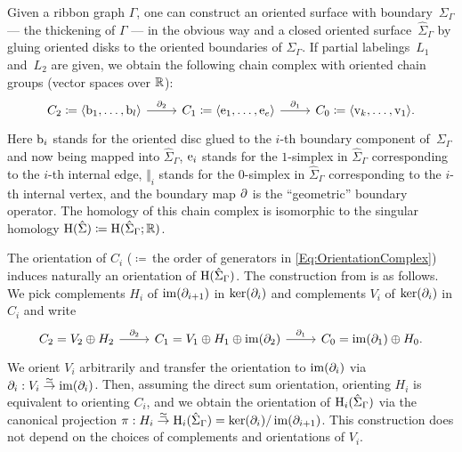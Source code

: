 \documentclass[\MainFolder/Text.tex]{subfiles}
\begin{document}
Given a ribbon graph $\Gamma$, one can construct an oriented surface with boundary~$\Sigma_\Gamma$ --- the thickening of $\Gamma$ --- in the obvious way and a closed oriented surface~$\hat{\Sigma}_\Gamma$ by gluing oriented disks to the oriented boundaries of $\Sigma_\Gamma$. If partial labelings~$L_1$ and~$L_2$ are given, we obtain the following chain complex with oriented chain groups (vector spaces over $\mathbb{R}$):
\begin{equation} \label{Eq:OrientationComplex}
\begin{tikzcd}
C_2\coloneqq \langle \Boundary_1,\dotsc,\Boundary_l \rangle \arrow{r}{\Bdd_2} & C_1\coloneqq \langle \Edge_1,\dotsc, \Edge_e \rangle \arrow{r}{\Bdd_1} &  C_0\coloneqq \langle \Vert_k,\dotsc, \Vert_1 \rangle.
\end{tikzcd}
\end{equation}
Here $\mathrm{b}_i$ stands for the oriented disc glued to the $i$-th boundary component of~$\Sigma_\Gamma$ and now being mapped into $\hat{\Sigma}_\Gamma$, $\mathrm{e}_i$ stands for the $1$-simplex in $\hat{\Sigma}_\Gamma$ corresponding to the $i$-th internal edge, $\Vert_i$ stands for the $0$-simplex in $\hat{\Sigma}_\Gamma$ corresponding to the $i$-th internal vertex, and the boundary map $\partial$ is the ``geometric'' boundary operator. The homology of this chain complex is isomorphic to the singular homology $\mathrm{H}(\hat{\Sigma})\coloneqq\mathrm{H}(\hat{\Sigma}_\Gamma;\mathbb{R})$.

The orientation of $C_i$ ($\coloneqq$\,the order of generators in \eqref{Eq:OrientationComplex}) induces naturally an orientation of $\mathrm{H}(\hat{\Sigma}_\Gamma)$. The construction from \cite[Appendix A]{Cieliebak2015} is as follows. We pick complements $H_i$ of $\operatorname{im}(\partial_{i+1})$ in $\operatorname{ker}(\partial_{i})$ and complements $V_i$ of $\operatorname{ker}(\partial_i)$ in $C_i$ and write 
$$\begin{tikzcd}
C_2 = V_2 \oplus H_2 \arrow{r}{\Bdd_2} & C_1 = V_1 \oplus H_1 \oplus \Im(\Bdd_2) \arrow{r}{\Bdd_1} & C_0 = \Im(\Bdd_1) \oplus H_0.
\end{tikzcd}$$
We orient $V_i$ arbitrarily and transfer the orientation to $\operatorname{im}(\partial_{i})$ via  $\partial_{i} : V_i \overset{\simeq}{\rightarrow} \operatorname{im}(\partial_{i})$. Then, assuming the direct sum orientation, orienting $H_i$ is equivalent to orienting $C_i$, and we obtain the orientation of $\mathrm{H}_i(\hat{\Sigma}_\Gamma)$ via the canonical projection $\pi: H_i \overset{\simeq}{\rightarrow} \mathrm{H}_i(\hat{\Sigma}_\Gamma) = \operatorname{ker}(\partial_i)/\operatorname{im}(\partial_{i+1})$. This construction does not depend on the choices of complements and orientations of $V_i$.
\end{document}
